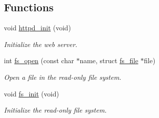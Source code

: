 \subsection*{Functions}
\begin{CompactItemize}
\item 
void \hyperlink{a00082_gc364305cee969a0be43c071722b136e6}{httpd\_\-init} (void)
\begin{CompactList}\small\item\em Initialize the web server. \item\end{CompactList}\item 
int \hyperlink{a00082_g31dac76e56ce334835427efcfb58e2bd}{fs\_\-open} (const char $\ast$name, struct \hyperlink{a00026}{fs\_\-file} $\ast$file)
\begin{CompactList}\small\item\em Open a file in the read-only file system. \item\end{CompactList}\item 
\hypertarget{a00082_ge9386973b39dad27b36dc6262ec4d6b9}{
void \hyperlink{a00082_ge9386973b39dad27b36dc6262ec4d6b9}{fs\_\-init} (void)}
\label{a00082_ge9386973b39dad27b36dc6262ec4d6b9}

\begin{CompactList}\small\item\em Initialize the read-only file system. \item\end{CompactList}\end{CompactItemize}
